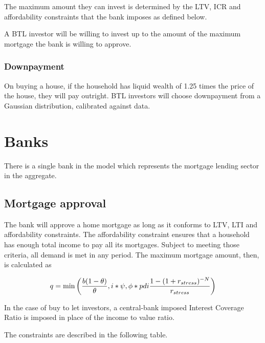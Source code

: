\documentclass{article}
\begin{document}
The maximum amount they can invest is determined by the LTV, ICR and
affordability constraints that the bank imposes as defined below.

A BTL investor will be willing to invest up to the amount of the maximum mortgage the bank is willing to approve.

\subsubsection{Downpayment}
On buying a house, if the household has liquid wealth of 1.25 times the price of the house, they will pay outright. BTL investors will choose downpayment from a Gaussian distribution, calibrated against data.

\section{Banks}

There is a single bank in the model which represents the mortgage lending
sector in the aggregate.

\subsection{Mortgage approval}
The bank will approve a home mortgage as long as it
conforms to LTV, LTI and affordability constraints. The affordability
constraint ensures that a household has enough total income to pay all its
mortgages. Subject to meeting those criteria, all demand is met in any
period. The maximum mortgage amount, then, is calculated as

\bigskip 
\begin{equation}
q=\min \left( \frac{b(1-\theta )}{\theta },i\ast \psi ,\phi \ast pdi\frac{%
1-(1+r_{stress})^{-N}}{r_{stress}}\right)
\end{equation}

\bigskip

In the case of buy to let investors, a central-bank imposed Interest Coverage Ratio is imposed in place of the income to value ratio.

\bigskip The constraints are described in the following table.

\bigskip
\end{document}
